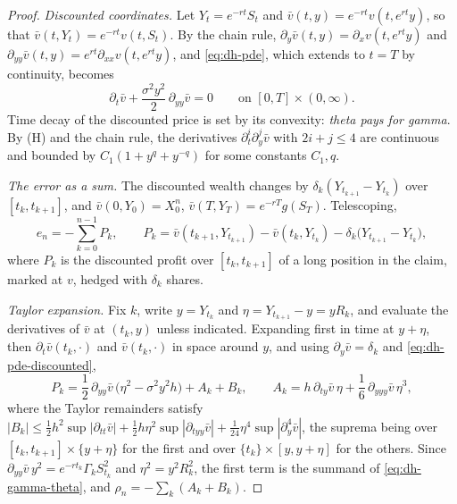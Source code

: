 \begin{proof}
\emph{Discounted coordinates.} Let $Y_t=e^{-rt}S_t$ and
$\bar v(t,y)=e^{-rt}v(t,e^{rt}y)$, so that $\bar v(t,Y_t)=e^{-rt}v(t,S_t)$. By the chain rule,
$\partial_y\bar v(t,y)=\partial_xv(t,e^{rt}y)$ and $\partial_{yy}\bar v(t,y)=e^{rt}\partial_{xx}v(t,e^{rt}y)$,
and \eqref{eq:dh-pde}, which extends to $t=T$ by continuity, becomes
\begin{equation}\label{eq:dh-pde-discounted}
  \partial_t\bar v+\frac{\sigma^2y^2}{2}\,\partial_{yy}\bar v=0\qquad\text{on }[0,T]\times(0,\infty).
\end{equation}
Time decay of the discounted price is set by its convexity: \emph{theta pays for gamma}. By (H)
and the chain rule, the derivatives $\partial_t^i\partial_y^j\bar v$ with $2i+j\le4$ are
continuous and bounded by $C_1(1+y^q+y^{-q})$ for some constants $C_1,q$.

\emph{The error as a sum.} The discounted wealth changes by $\delta_k(Y_{t_{k+1}}-Y_{t_k})$ over
$[t_k,t_{k+1}]$, and $\bar v(0,Y_0)=X^n_0$, $\bar v(T,Y_T)=e^{-rT}g(S_T)$. Telescoping,
\begin{equation}\label{eq:dh-error-sum}
  e_n=-\sum_{k=0}^{n-1}P_k,\qquad
  P_k=\bar v(t_{k+1},Y_{t_{k+1}})-\bar v(t_k,Y_{t_k})-\delta_k\big(Y_{t_{k+1}}-Y_{t_k}\big),
\end{equation}
where $P_k$ is the discounted profit over $[t_k,t_{k+1}]$ of a long position in the claim, marked
at $v$, hedged with $\delta_k$ shares.

\emph{Taylor expansion.} Fix $k$, write $y=Y_{t_k}$ and $\eta=Y_{t_{k+1}}-y=yR_k$, and evaluate the
derivatives of $\bar v$ at $(t_k,y)$ unless indicated. Expanding first in time at $y+\eta$, then
$\partial_t\bar v(t_k,\cdot)$ and $\bar v(t_k,\cdot)$ in space around $y$, and using
$\partial_y\bar v=\delta_k$ and \eqref{eq:dh-pde-discounted},
\[
  P_k=\frac12\,\partial_{yy}\bar v\,\big(\eta^2-\sigma^2y^2h\big)+A_k+B_k,\qquad
  A_k=h\,\partial_{ty}\bar v\,\eta+\frac16\,\partial_{yyy}\bar v\,\eta^3,
\]
where the Taylor remainders satisfy
$|B_k|\le\frac12h^2\sup|\partial_{tt}\bar v|+\frac12h\eta^2\sup|\partial_{tyy}\bar v|+\frac1{24}\eta^4\sup|\partial_{y}^4\bar v|$,
the suprema being over $[t_k,t_{k+1}]\times\{y+\eta\}$ for the first and over $\{t_k\}\times[y,y+\eta]$ for
the others. Since $\partial_{yy}\bar v\,y^2=e^{-rt_k}\Gamma_kS_{t_k}^2$ and $\eta^2=y^2R_k^2$, the first
term is the summand of \eqref{eq:dh-gamma-theta}, and $\rho_n=-\sum_k(A_k+B_k)$.


\end{proof}
